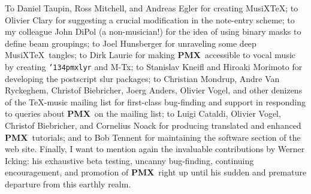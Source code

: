 \documentclass[11pt]{article}
\def\MusiXTeX{MusiX\TeX}
\def\bs{{\tt\char'134}}
\newcommand\PMXX{\textbf{PMX}}
\newcommand\PMX{\PMXX~}
\begin{document}
	To Daniel Taupin, Ross Mitchell, and Andreas Egler for creating 
\MusiXTeX{}; to Olivier Clary for suggesting a crucial modification in 
the note-entry scheme; 
to my colleague John DiPol (a non-musician!) for the idea of using binary masks 
to define beam groupings; 
to Joel Hunsberger for unraveling some deep \MusiXTeX~tangles;
to Dirk Laurie
for making \PMX accessible to vocal music by creating {\tt\bs pmxlyr} 
and {\bfx M-Tx};
to Stanislav Kneifl and Hiroaki Morimoto for developing the postscript
slur packages; to 
Christian Mondrup, Andre Van Ryckeghem, Christof Biebricher, Joerg Anders,
Olivier Vogel, and other denizens of the TeX-music mailing list
for first-class bug-finding and support in responding to queries about
\PMX on the mailing list; to Luigi Cataldi, Olivier Vogel, Christof 
Biebricher, and Cornelius Noack for producing translated and enhanced 
\PMX tutorials; and to Bob Tennent for maintaining the software section
of the web site.
Finally, I want to mention again the invaluable contributions by 
Werner Icking: his exhaustive beta testing, 
uncanny bug-finding, continuing encouragement, and promotion 
of \PMX right up until his sudden and premature departure from this
earthly realm. 
\end{document}
